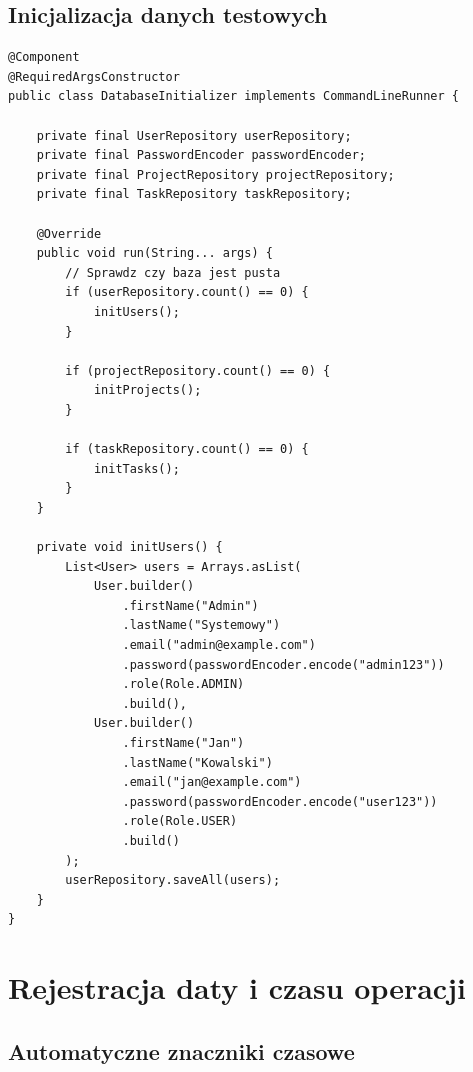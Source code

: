 \documentclass[12pt,a4paper]{report}
\begin{document}
\section{Inicjalizacja danych testowych}

\begin{lstlisting}[style=javastyle, caption={DatabaseInitializer - inicjalizacja danych}]
@Component
@RequiredArgsConstructor
public class DatabaseInitializer implements CommandLineRunner {

    private final UserRepository userRepository;
    private final PasswordEncoder passwordEncoder;
    private final ProjectRepository projectRepository;
    private final TaskRepository taskRepository;

    @Override
    public void run(String... args) {
        // Sprawdz czy baza jest pusta
        if (userRepository.count() == 0) {
            initUsers();
        }

        if (projectRepository.count() == 0) {
            initProjects();
        }

        if (taskRepository.count() == 0) {
            initTasks();
        }
    }

    private void initUsers() {
        List<User> users = Arrays.asList(
            User.builder()
                .firstName("Admin")
                .lastName("Systemowy")
                .email("admin@example.com")
                .password(passwordEncoder.encode("admin123"))
                .role(Role.ADMIN)
                .build(),
            User.builder()
                .firstName("Jan")
                .lastName("Kowalski")
                .email("jan@example.com")
                .password(passwordEncoder.encode("user123"))
                .role(Role.USER)
                .build()
        );
        userRepository.saveAll(users);
    }
}
\end{lstlisting}

\chapter{Rejestracja daty i czasu operacji}

\section{Automatyczne znaczniki czasowe}
\end{document}
